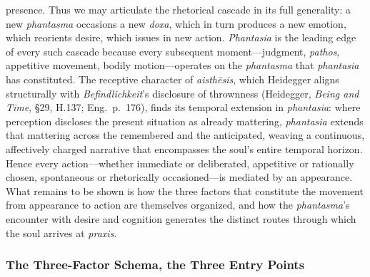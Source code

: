 \documentclass{article}
\begin{document}
presence. Thus we may articulate the rhetorical cascade in its full generality: a new \textit{phantasma} occasions a new \textit{doxa}, which in turn produces a new emotion, which reorients desire, which issues in new action. \textit{Phantasia} is the leading edge of every such cascade because every subsequent moment---judgment, \textit{pathos}, appetitive movement, bodily motion---operates on the \textit{phantasma} that \textit{phantasia} has constituted. The receptive character of \textit{aisth\={e}sis}, which Heidegger aligns structurally with \textit{Befindlichkeit}'s disclosure of thrownness (Heidegger, \textit{Being and Time}, \S29, H.137; Eng.~p.~176), finds its temporal extension in \textit{phantasia}: where perception discloses the present situation as already mattering, \textit{phantasia} extends that mattering across the remembered and the anticipated, weaving a continuous, affectively charged narrative that encompasses the soul's entire temporal horizon. Hence every action---whether immediate or deliberated, appetitive or rationally chosen, spontaneous or rhetorically occasioned---is mediated by an appearance. What remains to be shown is how the three factors that constitute the movement from appearance to action are themselves organized, and how the \textit{phantasma}'s encounter with desire and cognition generates the distinct routes through which the soul arrives at \textit{praxis}.


\subsubsection*{The Three-Factor Schema, the Three Entry Points}
\end{document}
